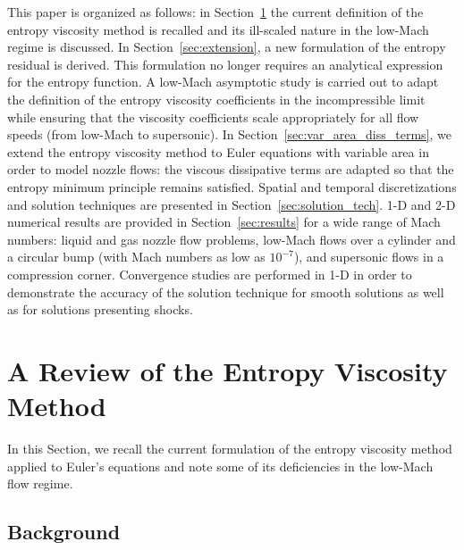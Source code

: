 \documentclass[review,10pt]{elsarticle}
\newcommand{\sct}[1]{Section~\ref{#1}}                   %
\newcommand{\tcr}[1]{\textcolor{red}{#1}}
\begin{document}
This paper is organized as follows: in \sct{sec:entro_visc} the current definition of the entropy viscosity method is recalled and 
its ill-scaled nature in the low-Mach regime is discussed. 
In \sct{sec:extension}, a new formulation of the entropy residual is derived. This formulation no longer requires an analytical expression 
for the entropy function. A low-Mach asymptotic study is carried out to adapt the definition of the entropy viscosity coefficients 
in the incompressible limit while ensuring that the viscosity coefficients scale appropriately for all flow speeds (from low-Mach to supersonic).
%
In \sct{sec:var_area_diss_terms}, we extend the entropy viscosity method to Euler equations with variable area in order to model nozzle flows: 
the viscous dissipative terms are adapted so that the entropy minimum principle remains satisfied.
Spatial and temporal discretizations and solution techniques are presented in \sct{sec:solution_tech}.
 1-D and 2-D numerical results 
are provided in \sct{sec:results} for a wide range of Mach numbers: liquid and gas nozzle flow problems, 
low-Mach flows over a cylinder and a circular bump (with Mach numbers as low as $10^{-7}$), and supersonic flows 
in a compression corner. %
Convergence studies are performed in 1-D in order to demonstrate the accuracy of the solution technique for smooth 
solutions as well as for solutions presenting shocks. 


\section{A Review of the Entropy Viscosity Method} \label{sec:entro_visc}

In this Section, we recall the current formulation of the entropy viscosity method applied to Euler's equations
and note some of its deficiencies in the low-Mach flow regime. 

\subsection{Background} \label{sec:background}
\end{document}
